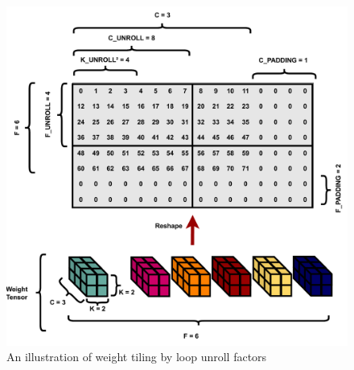 \begin{figure}[]
    \centering
    \includegraphics[scale=0.5]{fig/tiling.pdf}
    \caption{An illustration of weight tiling by loop unroll factors}
    \label{fig:tiling_connection_to_unroll_targets}
\end{figure}

\clearpage 





